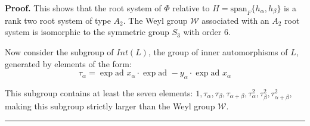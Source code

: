 \documentclass[12pt]{article}%
\newenvironment{proof}[1][Proof]{\textbf{#1.} }{\ \rule{0.5em}{0.5em}}
\begin{document}
\begin{proof}
   This shows that the root system of $\Phi$ relative to $H = \text{span}_F\{h_\alpha,h_\beta\}$ is a rank two root system of type $A_2$. The Weyl group $\mathcal{W}$ associated with an $A_2$ root system is isomorphic to the symmetric group $S_3$ with order 6. \newline

   Now consider the subgroup of $Int(L)$, the group of inner automorphisms of $L$, generated by elements of the form:
   $$ \tau_{\alpha} = \exp{\text{ad } x_{\alpha}} \cdot \exp{\text{ad } -y_{\alpha}}\cdot \exp{\text{ad } x_{\alpha}}  $$

\iffalse
   Order the basis elements as such : $(x_{\alpha},h_{\alpha},y_{\alpha},x_{\beta},h_{\beta},y_{\beta},x_{\alpha + \beta},h_{\alpha + \beta},y_{\alpha +\beta})$ \newline

   Now calculating the adjoints explicitly:

   \begin{gather*}
     \text{ad }x_{\alpha} = \begin{bmatrix}
       0 & -2 & 0 & 0 &0 &0 &0 &0 \\
       0 & 0 & 1 & 0 &0 &0 &0 &0 \\
       0 & 0 & 0 & 0 &0 &0 &0 &0 \\
       0 & 0 & 0 & 0 &0 &0 &0 &0 \\
       0 & 0 & 0 & 0 &0 &0 &0 &1 \\
       0 & 0 & 0 & 1 &0 &0 &0 &0 \\
       0 & 0 & 0 & 0 &0 &0 &0 &0 \\
       0 & 0 & 0 & 0 &0 &0 &0 &0
     \end{bmatrix}
      \text{ad }y_{\alpha} = \begin{bmatrix}
       0 & 0 & 0 & 0 &0 &0 &0 &0 \\
       -1 & 0 & 0 & 0 &0 &0 &0 &0 \\
       0 & 2 & 0 & 0 &0 &0 &0 &0 \\
       0 & 0 & 0 & 0 &0 &1 &0 &0 \\
       0 & 0 & 0 & 0 &0 &0 &0 &0 \\
       0 & 0 & 0 & 0 &0 &0 &0 &0 \\
       0 & 0 & 0 & 0 &0 &0 &0 &0 \\
       0 & 0 & 0 & 0 &1 &0 &0 &0
     \end{bmatrix}
   \end{gather*}
\fi

   This subgroup contains at least the seven elements: $1,\tau_{\alpha},\tau_{\beta},\tau_{\alpha+\beta},\tau_{\alpha}^2,\tau_{\beta}^2,\tau_{\alpha+\beta}^2$, making this subgroup strictly larger than the Weyl group $\mathcal{W}$.
\end{proof}
\end{document}
